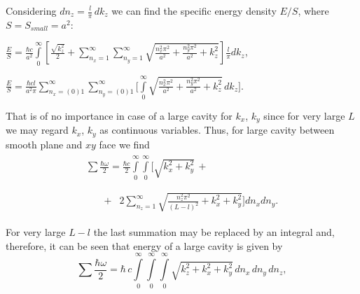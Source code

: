 \documentclass[twoside, 10pt, ptm]{article}
\begin{document}
\begin{multicols}{2}
    Considering \(dn_z = \frac{l}{\pi}\,dk_z\) we can find the specific energy density \(E/S\), where
\(S = S_{small} = a^2\):

\noindent
    \(\frac{E}{S} = \frac{\hbar c}{a^2}\int\limits_{0}^{\infty}\left[{\frac{\sqrt{k_z^2}}{2}+\sum\limits_{n_x=1}^{\infty}\sum\limits_{n_y=1}^{\infty}\sqrt{\frac{n_x^2\pi^2}{a^2}+\frac{n_y^2\pi^2}{a^2}+k_z^2}}\right]\frac{l}{\pi}dk_z\),

\noindent
    \(\frac{E}{S} = \frac{\hbar c l}{a^2 \pi} \sum\limits_{n_x=(0)1}^{\infty}
\sum\limits_{n_y=(0)1}^{\infty}\Bigg[\int\limits_{0}^{\infty}\sqrt{\frac{n_x^2\pi^2}{a^2}+\frac{n_y^2\pi^2}{a^2}+k_z^2}\,dk_z\Bigg]\).

    That is of no importance in case of a large cavity for \(k_x\), \(k_y\)
since for very large \(L\) we may regard \(k_x\), \(k_y\) as
continuous variables. Thus, for large cavity between smooth plane and \(xy\) face we find
\noindent
\begin{equation}\begin{array}{l}
\begin{array}{ll}
\sum\frac{\hbar\omega}{2} = \frac{\hbar c}{2}\int\limits_{0}^{\infty}\int\limits_{0}^{\infty}\Bigg[\sqrt{k_x^2+k_y^2}\,+ & \,\\
\end{array} \\
\begin{array}{rr}
\,\,\,\,\,\,\,\,\,\,\,+ & 2\sum\limits_{n_z=1}^{\infty}\sqrt{\frac{n_z^2 \pi^2}{(L-l)^2}+k_x^2+k_y^2}\Bigg]d{n_x}d{n_y}.\end{array}
\end{array}\end{equation}


For very large \(L-l\) the last summation may be replaced by an
integral and, therefore, it can be seen that energy of a large cavity is given by
\noindent
\begin{equation}\sum\frac{\hbar\omega}{2} = \hbar\,c\int\limits_{0}^{\infty}\int\limits_{0}^{\infty}\int\limits_{0}^{\infty}\sqrt{k_z^2+k_x^2+k_y^2}\,d{n_x}\,d{n_y}\,d{n_z},\end{equation}


\end{multicols}
\end{document}
